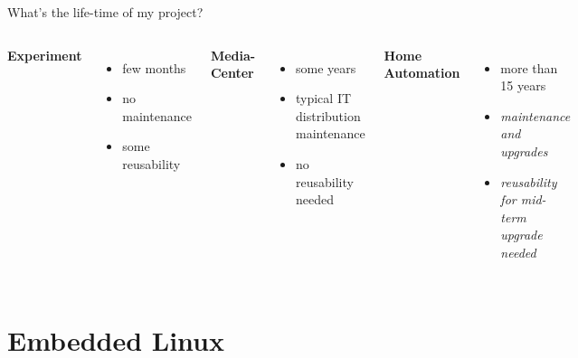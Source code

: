 \documentclass{beamer}
\begin{document}
\begin{frame}{What's the life-time of my project?}
	\begin{columns}[t]
        \centering
        \textbf{Experiment}
        \begin{itemize}
        		\item few months
        		\item no maintenance
        		\item some reusability
        \end{itemize}
        \centering
        \textbf{Media-Center}
        \begin{itemize}
        		\item some years
        		\item typical IT distribution maintenance
        		\item no reusability needed
        \end{itemize}
        \centering
        \textbf{Home Automation}
        \begin{itemize}
        		\item more than 15 years
        		\item \emph{maintenance and upgrades}
        		\item \emph{reusability for mid-term upgrade needed}
        \end{itemize}
    \end{columns}
\end{frame}

\section{Embedded Linux}
\end{document}
